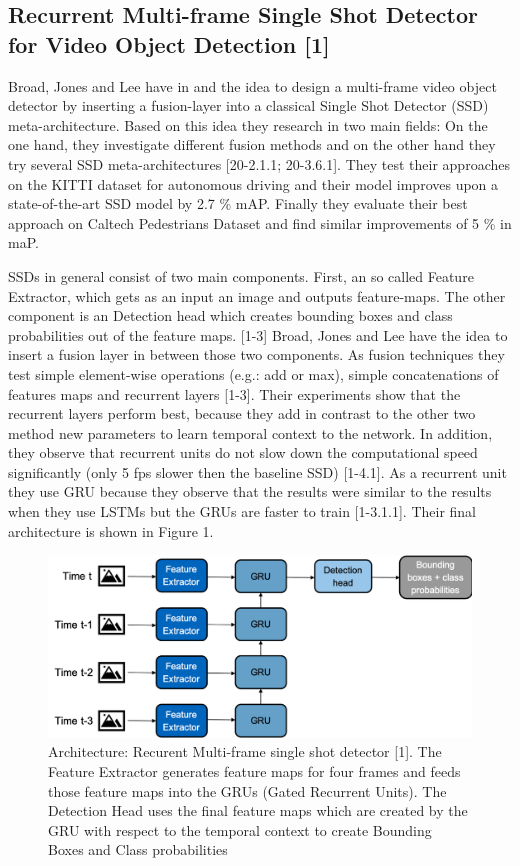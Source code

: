 \documentclass[conference]{IEEEtran}
\begin{document}
\subsection{Recurrent Multi-frame Single Shot Detector for Video Object Detection [1]}
Broad, Jones and Lee have in \cite{b1} and \cite{b12} the idea to design a multi-frame video object detector by inserting a fusion-layer into a classical Single Shot Detector (SSD) meta-architecture. Based on this idea they research in two main fields: On the one hand, they investigate different fusion methods and on the other hand they try several SSD meta-architectures [20-2.1.1; 20-3.6.1]. They test their approaches on the KITTI dataset \cite{b21} for autonomous driving and their model improves upon a state-of-the-art SSD model by 2.7 \% mAP. Finally they evaluate their best approach on Caltech Pedestrians Dataset \cite{b22} and find similar improvements of 5 \% in maP.   \newline

SSDs in general consist of two main components. First, an so called Feature Extractor, which gets as an input an image and outputs feature-maps. The other component is an Detection head which creates bounding boxes and class probabilities out of the feature maps. [1-3] Broad, Jones and Lee have the idea to insert a fusion layer in between those two components. As fusion techniques they test simple element-wise operations (e.g.: add or max), simple concatenations of features maps and recurrent layers [1-3]. Their experiments show that the recurrent layers perform best, because they add in contrast to the other two method new parameters to learn temporal context to the network. In addition, they observe that recurrent units do not slow down the computational speed significantly (only 5 fps slower then the baseline SSD) [1-4.1]. As a recurrent unit they use GRU because they observe that the results were similar to the results when they use LSTMs but the GRUs are faster to train [1-3.1.1]. Their final architecture is shown in Figure 1. 

\begin{figure} [h]
\includegraphics[width=\columnwidth]{RMFSSD}
\caption{Architecture: Recurent Multi-frame single shot detector [1]. The Feature Extractor generates feature maps for four frames and feeds those feature maps into the GRUs (Gated Recurrent Units). The Detection Head uses the final feature maps which are created by the GRU with respect to the temporal context to create Bounding Boxes and Class probabilities}
\end{figure}
\end{document}
